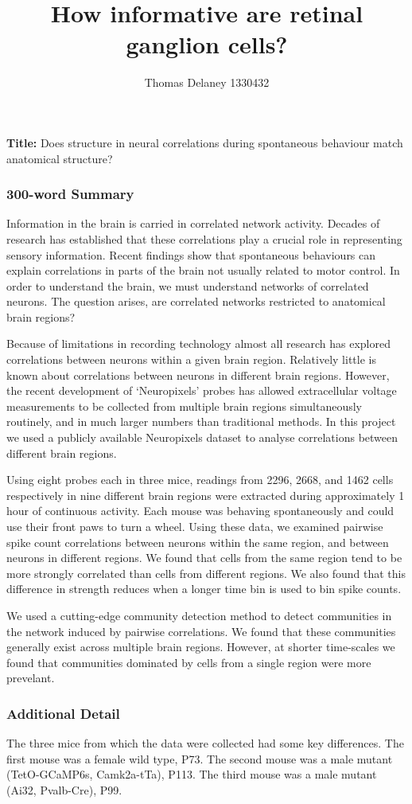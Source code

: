 \documentclass[a4paper,12pt]{article}
\title{How informative are retinal ganglion cells?}
\author{Thomas Delaney 1330432}
\theoremstyle{definition}
\begin{document}
\noindent
\textbf{Title:} Does structure in neural correlations during spontaneous behaviour match anatomical structure?
\subsubsection*{300-word Summary}
Information in the brain is carried in correlated network activity. Decades of research has established that these correlations play a crucial role in representing sensory information\cite{cohen1}. Recent findings show that spontaneous behaviours can explain correlations in parts of the brain not usually related to motor control\cite{stringer}. In order to understand the brain, we must understand networks of correlated neurons. The question arises, are correlated networks restricted to anatomical brain regions?

Because of limitations in recording technology almost all research has explored correlations between neurons within a given brain region. Relatively little is known about correlations between neurons in different brain regions. However, the recent development of `Neuropixels' probes\cite{jun} has allowed extracellular voltage measurements to be collected from multiple brain regions simultaneously routinely, and in much larger numbers than traditional methods. In this project we used a publicly available Neuropixels dataset to analyse correlations between different brain regions.

Using eight probes each in three mice, readings from 2296, 2668, and 1462 cells respectively in nine different brain regions were extracted during approximately 1 hour of continuous activity. Each mouse was behaving spontaneously and could use their front paws to turn a wheel\cite{stringer}. Using these data, we examined pairwise spike count correlations between neurons within the same region, and between neurons in different regions. We found that cells from the same region tend to be more strongly correlated than cells from different regions. We also found that this difference in strength reduces when a longer time bin is used to bin spike counts.

We used a cutting-edge community detection method\cite{humphries} to detect communities in the network induced by pairwise correlations. We found that these communities generally exist across multiple brain regions. However, at shorter time-scales we found that communities dominated by cells from a single region were more prevelant. 

\subsubsection*{Additional Detail}
The three mice from which the data were collected had some key differences. The first mouse was a female wild type, P73. The second mouse was a male mutant (TetO-GCaMP6s, Camk2a-tTa), P113. The third mouse was a male mutant (Ai32, Pvalb-Cre), P99.
\end{document}
